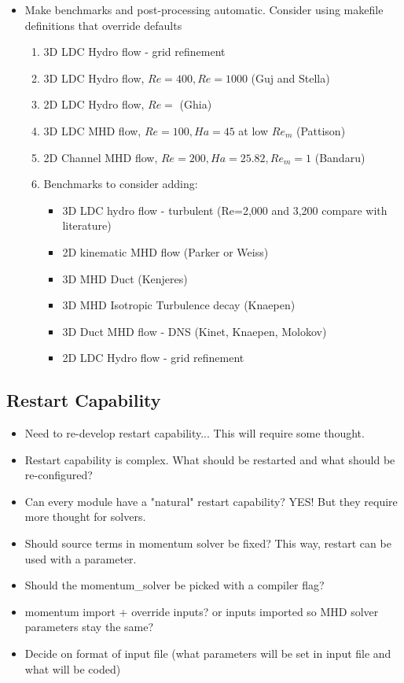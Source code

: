 \documentclass[11pt]{article}
\begin{document}
\begin{itemize}
\setlength\itemsep{-1em}
\item Make benchmarks and post-processing automatic. Consider using makefile definitions that override defaults
\begin{enumerate}
\setlength\itemsep{-1em}
\item 3D LDC Hydro flow - grid refinement
\item 3D LDC Hydro flow, $Re = 400, Re = 1000$ (Guj and Stella)
\item 2D LDC Hydro flow, $Re = $ (Ghia)
\item 3D LDC MHD flow, $Re = 100, Ha = 45$ at low $Re_m$ (Pattison)
\item 2D Channel MHD flow, $Re = 200, Ha = 25.82, Re_m = 1$ (Bandaru)
\item Benchmarks to consider adding:
\begin{itemize}
\setlength\itemsep{-1em}
\item 3D LDC hydro flow - turbulent (Re=2,000 and 3,200 compare with literature)
\item 2D kinematic MHD flow (Parker or Weiss)
\item 3D MHD Duct (Kenjeres)
\item 3D MHD Isotropic Turbulence decay (Knaepen)
\item 3D Duct MHD flow - DNS (Kinet, Knaepen, Molokov)
\item 2D LDC Hydro flow - grid refinement
\end{itemize}
\end{enumerate}
\end{itemize}


\subsection{Restart Capability}
\begin{itemize}
\setlength\itemsep{-1em}
\item Need to re-develop restart capability... This will require some thought.
\item Restart capability is complex. What should be restarted and what should be re-configured?
\item Can every module have a "natural" restart capability? YES! But they require more thought for solvers.
\item Should source terms in momentum solver be fixed? This way, restart can be used with a parameter.
\item Should the momentum\_solver be picked with a compiler flag?
\item momentum import + override inputs? or inputs imported so MHD solver parameters stay the same?
\item Decide on format of input file (what parameters will be set in input file and what will be coded)
\end{itemize}
\end{document}
